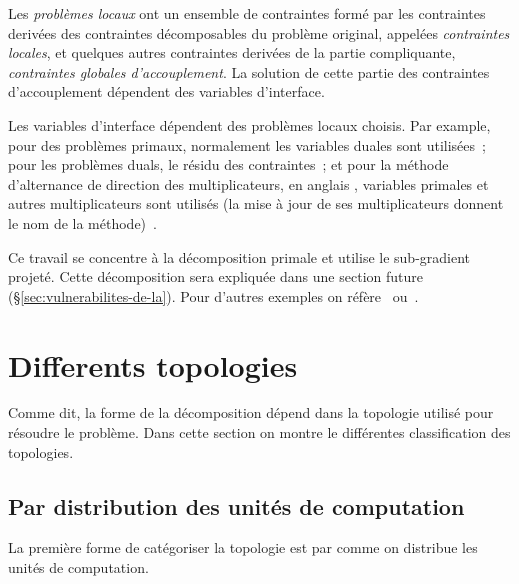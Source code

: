 \documentclass[../main.tex]{subfiles}
\begin{document}
Les \emph{problèmes locaux} ont un ensemble de contraintes formé par les contraintes derivées des contraintes décomposables du problème original, appelées \emph{contraintes locales}, et quelques autres contraintes derivées de la partie compliquante, \emph{contraintes globales d'accouplement}.
La solution de cette partie des contraintes d'accouplement dépendent des variables d'interface.

Les variables d'interface dépendent des problèmes locaux choisis.
Par example, pour des problèmes primaux, normalement les variables duales sont utilisées~\cite{Cohen1978}; pour les problèmes duals, le résidu des contraintes~\cite{BoydEtAl2015}; et pour la méthode d'alternance de direction des multiplicateurs, en anglais \ADMM, variables primales et autres multiplicateurs sont utilisés (la mise à jour de ses multiplicateurs donnent le nom de la méthode)~\cite{BoydEtAl2011}.

Ce travail se concentre à la décomposition primale et utilise le sub-gradient projeté.
Cette décomposition sera expliquée dans une section future (\S\ref{sec:vulnerabilites-de-la}).
Pour d'autres exemples on réfère~\cite{MaestreEtAl2014} ou~\cite{ConejoEtAl2006}.

\newpage
\section{Differents topologies}\label{sec:differents-topologies}
Comme dit, la forme de la décomposition dépend dans la topologie utilisé pour résoudre le problème.
Dans cette section on montre le différentes classification des topologies.

\subsection{Par distribution des unités de computation}\label{sec:par-distribution-des}

La première forme de catégoriser la topologie est par comme on distribue les unités de computation.
\end{document}
